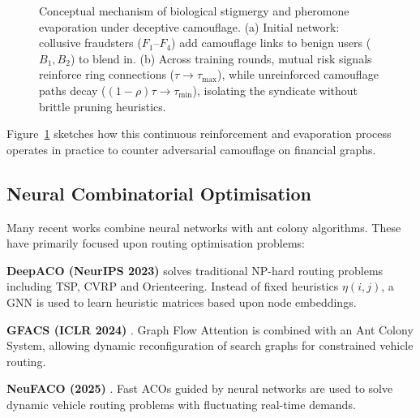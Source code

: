 \begin{figure}[!htbp]
{%
}
\caption[Conceptual Stigmergic Disentanglement of Collusive Fraud Rings]{Conceptual mechanism of biological stigmergy and pheromone evaporation under deceptive camouflage. (a) Initial network: collusive fraudsters ($F_1$--$F_4$) add camouflage links to benign users ($B_1, B_2$) to blend in. (b) Across training rounds, mutual risk signals reinforce ring connections ($\tau \to \tau_{\max}$), while unreinforced camouflage paths decay ($(1-\rho)\tau \to \tau_{\min}$), isolating the syndicate without brittle pruning heuristics.}
\label{fig:stigmergy_camouflage_concept}
\end{figure}

Figure~\ref{fig:stigmergy_camouflage_concept} sketches how this continuous reinforcement and evaporation process operates in practice to counter adversarial camouflage on financial graphs.

\subsection{Neural Combinatorial Optimisation}
\label{sec:neural_aco}
Many recent works combine neural networks with ant colony algorithms. These have primarily focused upon routing optimisation problems:

\textbf{DeepACO (NeurIPS 2023)} \cite{ye2023deepaco} solves traditional NP-hard routing problems including TSP, CVRP and Orienteering. Instead of fixed heuristics $\eta(i,j)$, a GNN is used to learn heuristic matrices based upon node embeddings.

\textbf{GFACS (ICLR 2024)} \cite{gfacs2024}. Graph Flow Attention is combined with an Ant Colony System, allowing dynamic reconfiguration of search graphs for constrained vehicle routing.

\textbf{NeuFACO (2025)} \cite{neufaco2025}. Fast ACOs guided by neural networks are used to solve dynamic vehicle routing problems with fluctuating real-time demands.

